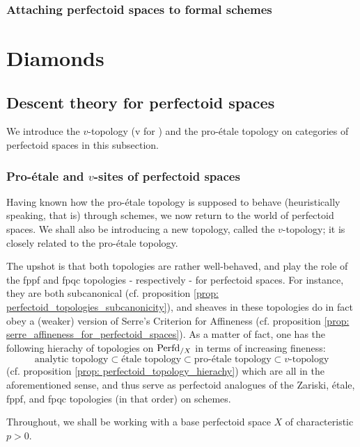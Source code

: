             \subsubsection{Attaching perfectoid spaces to formal schemes}
        
    \section{Diamonds} \label{section: diamonds}
        \subsection{Descent theory for perfectoid spaces}
            We introduce the $v$-topology (v for ) and the pro-\'etale topology on categories of perfectoid spaces in this subsection.
            \subsubsection{Pro-\'etale and \texorpdfstring{$v$}{}-sites of perfectoid spaces} \label{subsubsection: pro_etale_sites_and_v_sites_of_perfectoid_spaces}
                Having known how the pro-\'etale topology is supposed to behave (heuristically speaking, that is) through schemes, we now return to the world of perfectoid spaces. We shall also be introducing a new topology, called the $v$-topology; it is closely related to the pro-\'etale topology.
                
                The upshot is that both topologies are rather well-behaved, and play the role of the fppf and fpqc topologies - respectively - for perfectoid spaces. For instance, they are both subcanonical (cf. proposition \ref{prop: perfectoid_topologies_subcanonicity}), and sheaves in these topologies do in fact obey a (weaker) version of Serre's Criterion for Affineness (cf. proposition \ref{prop: serre_affineness_for_perfectoid_spaces}). As a matter of fact, one has the following hierachy of topologies on $\mathrm{Perfd}_{/X}$ in terms of increasing fineness:
                    $$\text{analytic topology} \subset \text{\'etale topology} \subset \text{pro-\'etale topology} \subset \text{$v$-topology}$$
                (cf. proposition \ref{prop: perfectoid_topology_hierachy}) which are all  in the aforementioned sense, and thus serve as perfectoid analogues of the Zariski, \'etale, fppf, and fpqc topologies (in that order) on schemes. 
                
                \begin{convention}
                    Throughout, we shall be working with a base perfectoid space $X$ of characteristic $p > 0$. 
                \end{convention}
                
